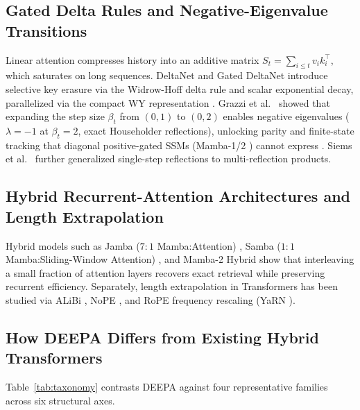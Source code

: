 \documentclass[10pt,a4paper]{article}
\begin{document}
\subsection{Gated Delta Rules and Negative-Eigenvalue Transitions}
Linear attention \cite{katharopoulos2020} compresses history into an additive matrix $S_t = \sum_{i\le t} v_i k_i^\top$, which saturates on long sequences. DeltaNet \cite{schlag2021,yang2024b} and Gated DeltaNet \cite{yang2024c} introduce selective key erasure via the Widrow-Hoff delta rule and scalar exponential decay, parallelized via the compact WY representation \cite{bischof1987}. Grazzi et al.\ \cite{grazzi2024} showed that expanding the step size $\beta_t$ from $(0,1)$ to $(0,2)$ enables negative eigenvalues ($\lambda=-1$ at $\beta_t=2$, exact Householder reflections), unlocking parity and finite-state tracking that diagonal positive-gated SSMs (Mamba-1/2 \cite{gu2023,dao2024}) cannot express \cite{merrill2024}. Siems et al.\ \cite{siems2025} further generalized single-step reflections to multi-reflection products.

\subsection{Hybrid Recurrent-Attention Architectures and Length Extrapolation}
Hybrid models such as Jamba ($7:1$ Mamba:Attention) \cite{lieber2024}, Samba ($1:1$ Mamba:Sliding-Window Attention) \cite{ren2024}, and Mamba-2 Hybrid \cite{waleffe2024} show that interleaving a small fraction of attention layers recovers exact retrieval while preserving recurrent efficiency. Separately, length extrapolation in Transformers has been studied via ALiBi \cite{press2022}, NoPE \cite{kazemnejad2023}, and RoPE frequency rescaling (YaRN \cite{peng2023}).

\subsection{How DEEPA Differs from Existing Hybrid Transformers}
Table~\ref{tab:taxonomy} contrasts DEEPA against four representative families across six structural axes.
\end{document}
